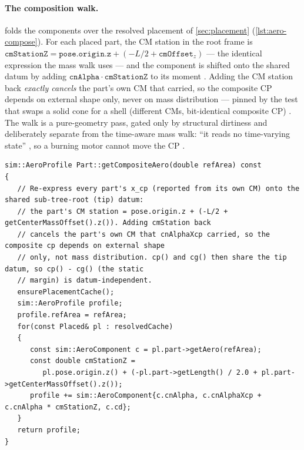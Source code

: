 \paragraph{The composition walk.}  folds the
components over the resolved placement of \cref{sec:placement} (\cref{lst:aero-compose}).
For each placed part, the CM station in the root frame is
$\mathtt{cmStationZ} = \mathtt{pose.origin.z} + (-L/2 + \mathtt{cmOffset}_z)$
 --- the identical expression the mass walk uses
 --- and the component is shifted onto the shared datum by
adding $\mathtt{cnAlpha}\cdot\mathtt{cmStationZ}$ to its moment
. Adding the CM station back \emph{exactly cancels} the
part's own CM that  carried, so the composite CP depends on external shape
only, never on mass distribution  --- pinned by the test that
swaps a solid cone for a shell (different CMs, bit-identical composite CP)
. The walk is a pure-geometry pass, gated only by
structural dirtiness and deliberately separate from the time-aware mass walk: ``it reads no
time-varying state'' , so a burning motor cannot move the CP
.

\begin{listing}[htbp]
\begin{verbatim}
sim::AeroProfile Part::getCompositeAero(double refArea) const
{
   // Re-express every part's x_cp (reported from its own CM) onto the shared sub-tree-root (tip) datum:
   // the part's CM station = pose.origin.z + (-L/2 + getCenterMassOffset().z()). Adding cmStation back
   // cancels the part's own CM that cnAlphaXcp carried, so the composite cp depends on external shape
   // only, not mass distribution. cp() and cg() then share the tip datum, so cp() - cg() (the static
   // margin) is datum-independent.
   ensurePlacementCache();
   sim::AeroProfile profile;
   profile.refArea = refArea;
   for(const Placed& pl : resolvedCache)
   {
      const sim::AeroComponent c = pl.part->getAero(refArea);
      const double cmStationZ =
         pl.pose.origin.z() + (-pl.part->getLength() / 2.0 + pl.part->getCenterMassOffset().z());
      profile += sim::AeroComponent{c.cnAlpha, c.cnAlphaXcp + c.cnAlpha * cmStationZ, c.cd};
   }
   return profile;
}
\end{verbatim}
\caption{The composition walk : one shared reference area,
one shared datum, one field addition per part. The station expression is identical to
the mass walk's , which is what puts CP and CG on the same
datum by construction.}\label{lst:aero-compose}
\end{listing}


